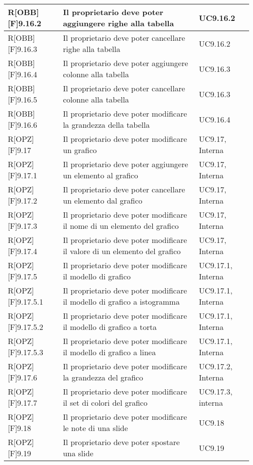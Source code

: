 	\begin{table}[h]
		\begin{tabular}{|p{}|p{}|p{}|}
			\midrule

			R[OBB][F]9.16.2 & Il proprietario deve poter aggiungere righe alla tabella & UC9.16.2 \\ \midrule
			R[OBB][F]9.16.3 & Il proprietario deve poter cancellare righe alla tabella & UC9.16.2 \\ \midrule
			R[OBB][F]9.16.4 & Il proprietario deve poter aggiungere colonne alla tabella & UC9.16.3 \\ \midrule
			R[OBB][F]9.16.5 & Il proprietario deve poter cancellare colonne alla tabella & UC9.16.3 \\ \midrule
			R[OBB][F]9.16.6 & Il proprietario deve poter modificare la grandezza della tabella & UC9.16.4 \\ \midrule
			R[OPZ][F]9.17 & Il proprietario deve poter modificare un grafico & UC9.17, Interna \\ \midrule
			R[OPZ][F]9.17.1 & Il proprietario deve poter aggiungere un elemento al grafico & UC9.17, Interna \\ \midrule
			R[OPZ][F]9.17.2 & Il proprietario deve poter cancellare un elemento dal grafico & UC9.17, Interna \\ \midrule
			R[OPZ][F]9.17.3 & Il proprietario deve poter modificare il nome di un elemento del grafico & UC9.17, Interna \\ \midrule
			R[OPZ][F]9.17.4 & Il proprietario deve poter modificare il valore di un elemento del grafico & UC9.17, Interna \\ \midrule
			R[OPZ][F]9.17.5 & Il proprietario deve poter modificare il modello di grafico & UC9.17.1, Interna \\ \midrule
			R[OPZ][F]9.17.5.1 & Il proprietario deve poter modificare il modello di grafico a istogramma & UC9.17.1, Interna \\ \midrule
			R[OPZ][F]9.17.5.2 & Il proprietario deve poter modificare il modello di grafico a torta & UC9.17.1, Interna \\ \midrule
			R[OPZ][F]9.17.5.3 & Il proprietario deve poter modificare il modello di grafico a linea & UC9.17.1, Interna \\ \midrule
			R[OPZ][F]9.17.6 & Il proprietario deve poter modificare la grandezza del grafico & UC9.17.2, Interna \\ \midrule
			R[OPZ][F]9.17.7 & Il proprietario deve poter modificare il set di colori del grafico & UC9.17.3, interna \\ \midrule
			R[OPZ][F]9.18 & Il proprietario deve poter modificare le note di una slide & UC9.18 \\ \midrule
			R[OPZ][F]9.19 & Il proprietario deve poter spostare una slide & UC9.19 \\ \midrule

	\end{tabular}
	\end{table}
	\newpage

